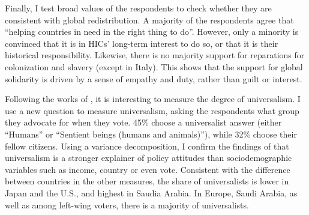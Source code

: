 \documentclass[12pt,english]{article}
\begin{document}
\begin{bibunit}
Finally, I test broad values of the respondents to check whether they are consistent with global redistribution. A majority of the respondents agree that ``helping countries in need in the right thing to do''. However, only a minority is convinced that it is in HICs' long-term interest to do so, or that it is their historical responsibility. Likewise, there is no majority support for reparations for colonization and slavery (except in Italy). This shows that the support for global solidarity is driven by a sense of empathy and duty, rather than guilt or interest. %

Following the works of \cite{enke_moral_2020,cappelen_universalism_2025}, it is interesting to measure the degree of universalism. %
I use a new question to measure universalism, asking the respondents what group they advocate for when they vote. 45\% choose a universalist answer (either ``Humans'' or ``Sentient beings (humans and animals)''), while 32\% choose their fellow citizens. Using a variance decomposition, I confirm the findings of \cite{enke_moral_2023} that universalism is a stronger explainer of policy attitudes than sociodemographic variables such as income, country or even vote. %
Consistent with the difference between countries in the other measures, the share of universalists is lower in Japan and the U.S., and highest in Saudia Arabia. %
In Europe, Saudi Arabia, as well as among left-wing voters, there is a majority of universalists. 



\end{bibunit}
\end{document}
